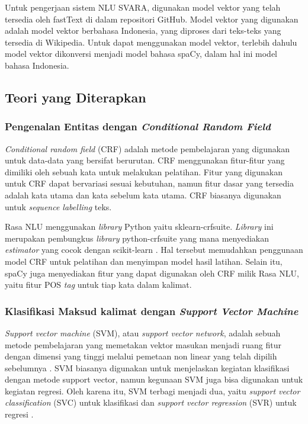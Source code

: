 Untuk pengerjaan sistem NLU SVARA, digunakan model vektor yang telah tersedia oleh fastText di dalam repositori GitHub. Model vektor yang digunakan adalah model vektor berbahasa Indonesia, yang diproses dari teks-teks yang tersedia di Wikipedia. Untuk dapat menggunakan model vektor, terlebih dahulu model vektor dikonversi menjadi model bahasa spaCy, dalam hal ini model bahasa Indonesia.

\subsection{Teori yang Diterapkan}

\subsubsection{Pengenalan Entitas dengan \textit{Conditional Random Field}}

\textit{Conditional random field} (CRF) adalah metode pembelajaran yang digunakan untuk data-data yang bersifat berurutan. CRF menggunakan fitur-fitur yang dimiliki oleh sebuah kata untuk melakukan pelatihan. Fitur yang digunakan untuk CRF dapat bervariasi sesuai kebutuhan, namun fitur dasar yang tersedia adalah kata utama dan kata sebelum kata utama. CRF biasanya digunakan untuk \textit{sequence labelling} teks.

Rasa NLU menggunakan \textit{library} Python yaitu sklearn-crfsuite. \textit{Library} ini merupakan pembungkus \textit{library} python-crfsuite yang mana menyediakan \textit{estimator} yang cocok dengan scikit-learn \parencite{sklearncrf}. Hal tersebut memudahkan penggunaan model CRF untuk pelatihan dan menyimpan model hasil latihan. Selain itu, spaCy juga menyediakan fitur yang dapat digunakan oleh CRF milik Rasa NLU, yaitu fitur POS \textit{tag} untuk tiap kata dalam kalimat.

\subsubsection{Klasifikasi Maksud kalimat dengan \textit{Support Vector Machine}}

\textit{Support vector machine} (SVM), atau \textit{support vector network}, adalah sebuah metode pembelajaran yang memetakan vektor masukan menjadi ruang fitur dengan dimensi yang tinggi melalui pemetaan non linear yang telah dipilih sebelumnya \parencite{cortes1995support}. SVM biasanya digunakan untuk menjelaskan kegiatan klasifikasi dengan metode support vector, namun kegunaan SVM juga bisa digunakan untuk kegiatan regresi. Oleh karena itu, SVM terbagi menjadi dua, yaitu \textit{support vector classification} (SVC) untuk klasifikasi dan \textit{support vector regression} (SVR) untuk regresi \parencite{gunn1998support}.

